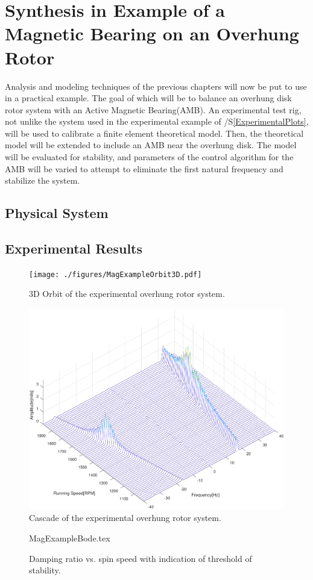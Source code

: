 \chapter{Synthesis in Example of a Magnetic Bearing on an Overhung Rotor}
Analysis and modeling techniques of the previous chapters will now be put to use in a practical example. The goal of which will be to balance an overhung disk rotor system with an Active Magnetic Bearing(AMB). An experimental test rig, not unlike the system used in the experimental example of /S\ref{ExperimentalPlots}, will be used to calibrate a  finite element theoretical model. Then, the theoretical model will be extended to include an AMB near the overhung disk. The model will be evaluated for stability, and parameters of the control algorithm for the AMB will be varied to attempt to eliminate the first natural frequency and stabilize the system.
\section{Physical System}

\section{Experimental Results}

\begin{figure}
	\centering
	\texttt{[image: ./figures/MagExampleOrbit3D.pdf]}
	\caption{3D Orbit of the experimental overhung rotor system.}
	\label{fig:MagExampleOrbit3D}
\end{figure}
\begin{figure}
	\centering
	\includegraphics[width=\linewidth]{./figures/MagExampleCascade.pdf}
	\caption{Cascade of the experimental overhung rotor system.}
	\label{fig:MagExampleCascade}
\end{figure}
\begin{figure}[!htb]
	\def\width{.8\linewidth}
	\def\height{.4\linewidth}
	\def\sep{3em}
	\centering
	{MagExampleBode.tex}
	\caption{Damping ratio vs. spin speed with indication of threshold of stability.}
	\label{fig:MagExampleBode}
\end{figure}
